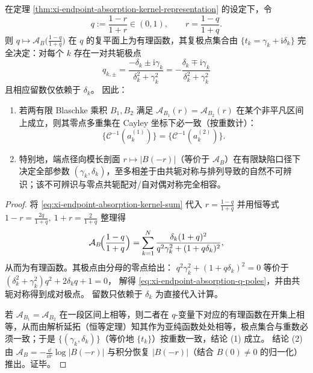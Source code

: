 \begin{theorem}\label{thm:xi-endpoint-absorption-inversion-uniqueness}
在定理 \ref{thm:xi-endpoint-absorption-kernel-representation} 的设定下，令
\[
q:=\frac{1-r}{1+r}\in(0,1),
\qquad r=\frac{1-q}{1+q}.
\]
则 \(q\mapsto \mathcal{A}_B\!\bigl(\frac{1-q}{1+q}\bigr)\) 在 \(q\) 的复平面上为有理函数，其复极点集合由 \(\{t_k=\gamma_k+\mathrm{i}\delta_k\}\) 完全决定：对每个 \(k\) 存在一对共轭极点
\begin{equation}\label{eq:xi-endpoint-absorption-q-poles}
\boxed{\;
q_{k,\pm}=\frac{-\delta_k\pm \mathrm{i}\gamma_k}{\delta_k^2+\gamma_k^2}
=-\frac{\delta_k\mp \mathrm{i}\gamma_k}{\delta_k^2+\gamma_k^2}\;}
\end{equation}
且相应留数仅依赖于 \(\delta_k\)。
因此：
\begin{enumerate}
  \item 若两有限 Blaschke 乘积 \(B_1,B_2\) 满足 \(\mathcal{A}_{B_1}(r)=\mathcal{A}_{B_2}(r)\) 在某个非平凡区间上成立，则其零点多重集在 Cayley 坐标下必一致（按重数计）：
  \[
  \{\mathcal{C}^{-1}(a_k^{(1)})\}=\{\mathcal{C}^{-1}(a_k^{(2)})\}.
  \]
  \item 特别地，端点径向模长剖面 \(r\mapsto |B(-r)|\)（等价于 \(\mathcal{A}_B\)）在有限缺陷口径下决定全部参数 \((\gamma_k,\delta_k)\)，至多相差于由共轭对称与排列导致的自然不可辨识；该不可辨识与零点共轭配对/自对偶对称完全相容。
\end{enumerate}
\end{theorem}

\begin{proof}
将 \eqref{eq:xi-endpoint-absorption-kernel-sum} 代入 \(r=\frac{1-q}{1+q}\) 并用恒等式
\(
1-r=\frac{2q}{1+q},\ 1+r=\frac{2}{1+q}
\)
整理得
\[
\mathcal{A}_B\!\Bigl(\frac{1-q}{1+q}\Bigr)
=\sum_{k=1}^{N}
\frac{\delta_k(1+q)^2}{q^2\gamma_k^2+(1+q\delta_k)^2},
\]
从而为有理函数。其极点由分母的零点给出：
\(
q^2\gamma_k^2+(1+q\delta_k)^2=0
\)
等价于
\(
(\delta_k^2+\gamma_k^2)q^2+2\delta_k q+1=0
\)，
解得 \eqref{eq:xi-endpoint-absorption-q-poles}，并由共轭对称得到成对极点。
留数只依赖于 \(\delta_k\) 为直接代入计算。
\par
若 \(\mathcal{A}_{B_1}=\mathcal{A}_{B_2}\) 在一段区间上相等，则二者在 \(q\)-变量下对应的有理函数在开集上相等，从而由解析延拓（恒等定理）知其作为亚纯函数处处相等，极点集合与重数必须一致；于是 \(\{(\gamma_k,\delta_k)\}\)（等价地 \(\{t_k\}\)）按重数一致，结论 (1) 成立。
结论 (2) 由 \(\mathcal{A}_B=-\frac{\dd}{\dd r}\log|B(-r)|\) 与积分恢复 \(|B(-r)|\)（结合 \(B(0)\neq 0\) 的归一化）推出。证毕。
\end{proof}

